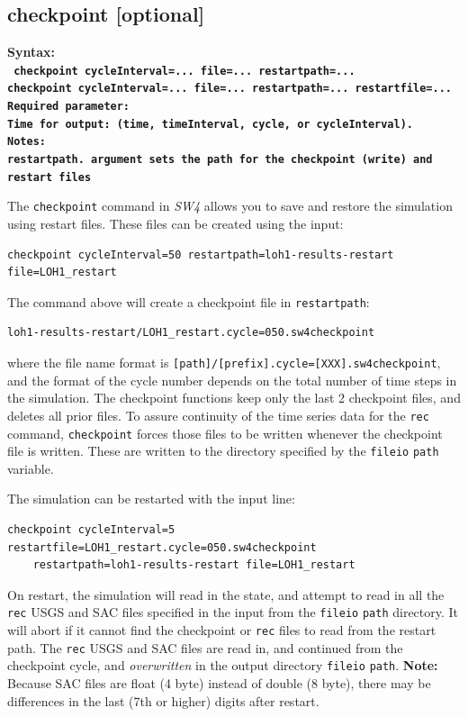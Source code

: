 \documentclass[11pt]{report}
\begin{document}
\subsection{checkpoint [optional]}
\label{keyword:checkpoint}
\begin{flushleft}
\bf Syntax:\\ \tt
checkpoint cycleInterval=... file=... restartpath=... \\
checkpoint cycleInterval=... file=... restartpath=... restartfile=... \\
\bf Required parameter:\\
\rm Time for output: (time, timeInterval, cycle, or cycleInterval).\\
\bf Notes:\\
\rm \verb+restartpath+. argument sets the path for the checkpoint
  (write) and restart files
\end{flushleft}
%
The \verb+checkpoint+ command in \emph{SW4} allows you to save
and restore the simulation using restart files.
These files can be created using the input:
\begin{verbatim}
checkpoint cycleInterval=50 restartpath=loh1-results-restart file=LOH1_restart
\end{verbatim}
The command above will create a checkpoint file in \verb+restartpath+:
\begin{verbatim}
loh1-results-restart/LOH1_restart.cycle=050.sw4checkpoint
\end{verbatim}
  where the file name format is {\tt [path]/[prefix].cycle=[XXX].sw4checkpoint},
  and the format of the cycle number depends on the total number
  of time steps in the simulation.
The checkpoint functions keep only the last 2 checkpoint files, and deletes
  all prior files.
To assure continuity of the time series data for the \verb+rec+ command,
  \verb+checkpoint+ forces those files to be written whenever the checkpoint
  file is written.
These are written to the directory specified by the \verb+fileio+ \verb+path+
  variable.

The simulation can be restarted with the input line:
\begin{verbatim}
checkpoint cycleInterval=5 restartfile=LOH1_restart.cycle=050.sw4checkpoint
    restartpath=loh1-results-restart file=LOH1_restart
\end{verbatim}
On restart, the simulation will read in the state, and attempt to
  read in all the \verb+rec+ USGS and SAC files specified in the
  input from the \verb+fileio+ \verb+path+ directory.
It will abort if it cannot find the checkpoint or \verb+rec+ files to read
  from the restart path.
The \verb+rec+ USGS and SAC files are read in, and continued from the
  checkpoint cycle, and \emph{overwritten} in the output 
  directory \verb+fileio+ \verb+path+.
{\bf Note:} Because SAC files are float (4 byte) instead of double (8 byte),
  there may be differences in the last (7th or higher) digits after restart.
\end{document}
